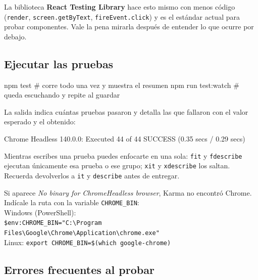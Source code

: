 \documentclass[11pt,a4paper]{article}
\newcommand{\cmd}[1]{\texttt{\color{reactdark}#1}}
\begin{document}
\begin{nota}
La biblioteca \textbf{React Testing Library} hace esto mismo con menos código (\cmd{render}, \cmd{screen.getByText}, \cmd{fireEvent.click}) y es el estándar actual para probar componentes. Vale la pena mirarla después de entender lo que ocurre por debajo.
\end{nota}

\subsection{Ejecutar las pruebas}

\begin{terminal}
npm test          # corre todo una vez y muestra el resumen
npm run test:watch  # queda escuchando y repite al guardar
\end{terminal}

La salida indica cuántas pruebas pasaron y detalla las que fallaron con el valor esperado y el obtenido:
\begin{terminal}
Chrome Headless 140.0.0: Executed 44 of 44 SUCCESS (0.35 secs / 0.29 secs)
\end{terminal}

Mientras escribes una prueba puedes enfocarte en una sola: \cmd{fit} y \cmd{fdescribe} ejecutan únicamente esa prueba o ese grupo; \cmd{xit} y \cmd{xdescribe} los saltan. Recuerda devolverlos a \cmd{it} y \cmd{describe} antes de entregar.

\begin{atencion}
Si aparece \emph{No binary for ChromeHeadless browser}, Karma no encontró Chrome. Indícale la ruta con la variable \cmd{CHROME\_BIN}:\\
Windows (PowerShell):\\
\mbox{\footnotesize\cmd{\$env:CHROME\_BIN="C:\textbackslash Program Files\textbackslash Google\textbackslash Chrome\textbackslash Application\textbackslash chrome.exe"}}\\
Linux: \cmd{export CHROME\_BIN=\$(which google-chrome)}
\end{atencion}

\subsection{Errores frecuentes al probar}
\end{document}

